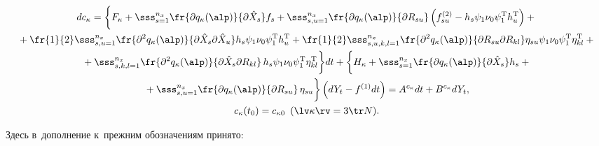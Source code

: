    \begin{multline}

   dc_\kappa =\biggl\{ F_\kappa +\sss_{s=1}^{n_x} \fr{\partial q_\kappa

    (\alp)}{\partial \hat X_s} f_s +\sss_{s,u=1}^{n_x}

    \fr{\partial     q_\kappa (\alp)}{\partial R_{su}}

    \left( f_{su}^{(2)} - h_s \psi_1\nu_0\psi_1^{\mathrm{T}} h_u^{\mathrm{T}}\right)+{}\\

{}+\fr{1}{2}\sss_{s,u=1}^{n_x} \fr{\partial^2 q_\kappa (\alp)}

{\partial \hat X_s \partial \hat X_u}  h_s \psi_1\nu_0\psi_1^{\mathrm{T}} h_u^{\mathrm{T}} + \fr{1}{2}

    \sss_{s,u,k,l=1}^{n_x} \fr{\partial^2 q_\kappa (\alp)}

    {\partial R_{su}\partial R_{kl}}

    \eta_{su} \psi_1\nu_0\psi_1^{\mathrm{T}} \eta_{kl}^{\mathrm{T}}+{}\\

{}+\sss_{s,k,l=1}^{n_x} \fr{\partial^2 q_\kappa (\alp)}

{\partial \hat X_s \partial R_{kl}}\, 

h_s \psi_1\nu_0\psi_1^{\mathrm{T}} \eta_{kl}^{\mathrm{T}}\biggr\} dt +

\biggl\{ H_\kappa + \sss_{s=1}^{n_x} 

\fr{\partial q_\kappa (\alp)}{\partial \hat X_s} h_s +{}\\

{}+\sss_{s,u=1}^{n_x} \fr{\partial

    q_\kappa (\alp)}{\partial R_{su}}\,\eta_{su}\biggr\} \left(dY_t -

    f^{(1)} dt\right)= A^{c_\kappa} dt + B^{c_\kappa} dY_t,\\ 

    c_\kappa (t_0) = c_{\kappa0} \enskip (\lv\kappa\rv= 3\tr N).\label{e4.10-s1}

    \end{multline}

Здесь в~дополнение к~прежним обозначениям принято:



\noindent

